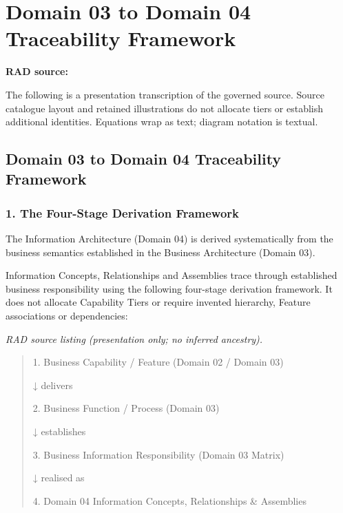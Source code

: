 \chapter{Domain 03 to Domain 04 Traceability Framework}\label{rad:traceability}
\noindent\textbf{RAD source:} \texttt{}

The following is a presentation transcription of the governed source. Source catalogue layout and retained illustrations do not allocate tiers or establish additional identities. Equations wrap as text; diagram notation is textual.

\label{rad:traceability:1}
\section*{Domain 03 to Domain 04 Traceability Framework}
\label{rad:traceability:3}



\label{rad:traceability:5}
\subsection*{1. The Four-Stage Derivation Framework}
\label{rad:traceability:7}

The Information Architecture (Domain 04) is derived systematically from the business semantics established in the Business Architecture (Domain 03).

\label{rad:traceability:9}

Information Concepts, Relationships and Assemblies trace through established business responsibility using the following four-stage derivation framework. It does not allocate Capability Tiers or require invented hierarchy, Feature associations or dependencies:

\label{rad:traceability:11}

\textit{RAD source listing (presentation only; no inferred ancestry).}
\begin{quote}
1. Business Capability / Feature (Domain 02 / Domain 03)

↓ delivers

2. Business Function / Process (Domain 03)

↓ establishes

3. Business Information Responsibility (Domain 03 Matrix)

↓ realised as

4. Domain 04 Information Concepts, Relationships \& Assemblies
\end{quote}
\label{rad:traceability:21}

